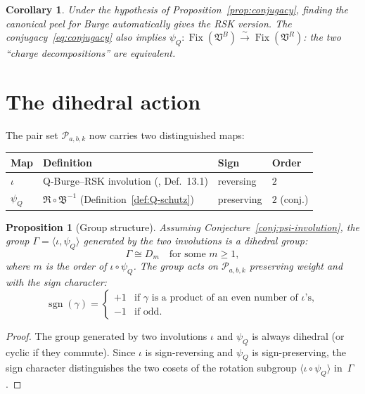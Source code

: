 \documentclass[11pt]{article}
\DeclareMathOperator{\sgn}{sgn}
\DeclareMathOperator{\Fix}{Fix}
\theoremstyle{plain}
\newtheorem{proposition}[theorem]{Proposition}
\newtheorem{corollary}[theorem]{Corollary}
\theoremstyle{definition}
\begin{document}
\begin{corollary}\label{cor:half-work}
Under the hypothesis of Proposition~\ref{prop:conjugacy}, finding
the canonical peel for Burge automatically gives the RSK version.
The conjugacy~\eqref{eq:conjugacy} also implies
$\psi_Q\colon \Fix(\mathfrak{V}^B) \xrightarrow{\sim}
\Fix(\mathfrak{V}^R)$: the two ``charge decompositions'' are
equivalent.
\end{corollary}


\section{The dihedral action}
\label{sec:dihedral}

The pair set $\mathcal{P}_{a,b,k}$ now carries two
distinguished maps:
\begin{center}
\begin{tabular}{l|l|l|l}
\textbf{Map} & \textbf{Definition} & \textbf{Sign}
  & \textbf{Order} \\ \hline
$\iota$ & Q-Burge--RSK involution
  (\cite{LOCAL_RULE}, Def.~13.1)
  & reversing & $2$ \\
$\psi_Q$ & $\mathfrak{R} \circ \mathfrak{B}^{-1}$
  (Definition~\ref{def:Q-schutz})
  & preserving & $2$ (conj.)
\end{tabular}
\end{center}

\begin{proposition}[Group structure]
\label{prop:dihedral}
Assuming Conjecture~\ref{conj:psi-involution}, the group
$\Gamma = \langle \iota, \psi_Q \rangle$ generated by the
two involutions is a dihedral group:
\[
  \Gamma \cong D_m
  \quad\text{for some } m \geq 1,
\]
where $m$ is the order of $\iota \circ \psi_Q$.  The group
acts on $\mathcal{P}_{a,b,k}$ preserving weight and with the
sign character:
\[
  \sgn(\gamma) = \begin{cases}
    +1 & \text{if } \gamma \text{ is a product of an even
      number of } \iota\text{'s}, \\
    -1 & \text{if odd}.
  \end{cases}
\]
\end{proposition}

\begin{proof}
The group generated by two involutions $\iota$ and $\psi_Q$
is always dihedral (or cyclic if they commute).  Since $\iota$
is sign-reversing and $\psi_Q$ is sign-preserving, the sign
character distinguishes the two cosets of the rotation subgroup
$\langle \iota \circ \psi_Q \rangle$ in~$\Gamma$.
\end{proof}
\end{document}
